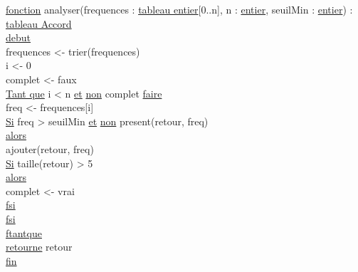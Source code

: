 \begin{tabbing}

\ul{fonction} analyser(frequences : \ul{tableau entier}[0..n], n : \ul{entier}, seuilMin : \ul{entier}) : \ul{tableau Accord}\\
\ul{debut}\\
frequences <- trier(frequences)\\
i <- 0\\
complet <- faux\\
\ul{Tant que} i < n \ul{et} \ul{non} complet \ul{faire}\\
    freq <- frequences[i]\\
    \ul{Si} freq > seuilMin \ul{et} \ul{non} present(retour, freq)\\
    \ul{alors}\\
        ajouter(retour, freq)\\
        \ul{Si} taille(retour) > 5\\
        \ul{alors}\\
            complet <- vrai\\
        \ul{fsi}\\
    \ul{fsi}\\
\ul{ftantque}\\
\ul{retourne} retour\\
\ul{fin}\\
\end{tabbing}

